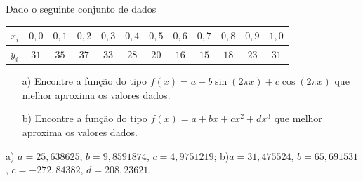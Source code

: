 \begin{exer} Dado o seguinte conjunto de dados
  \begin{center}
    \begin{tabular}{l|ccccccccccc}
      $x_i$ & $0,0$ & $0,1$ & $0,2$ & $0,3$ & $0,4$ & $0,5$ & $0,6$ & $0,7$ & $0,8$ & $0,9$ & $1,0$\\\hline
      $y_i$ & $31$ & $35$ & $37$ & $33$ & $28$ & $20$ & $16$ & $15$ & $18$ & $23$ & $31$
    \end{tabular}
  \end{center} 
\begin{itemize}
\item[a)] Encontre a função do tipo $f(x)=a+b\sin(2\pi x)+c\cos(2\pi x)$ que melhor aproxima os valores dados.
\item[b)] Encontre a função do tipo $f(x)=a+bx+cx^2+dx^3$ que melhor aproxima os valores dados.
\end{itemize}
\end{exer}
\begin{resp}
  
    a) $a=25,638625$, $b=9,8591874$, $c=4,9751219$; b)$a=31,475524$, $b=65,691531$, $c=-272,84382$, $d=208,23621$.
  
\end{resp}





